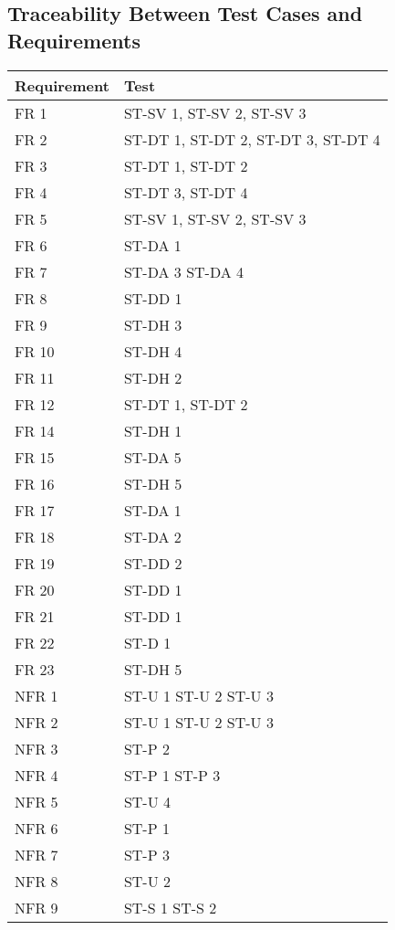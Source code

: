 \documentclass[12pt, titlepage]{article}
\begin{document}
\subsection{Traceability Between Test Cases and Requirements}
\begin{tabular}{| p{} | p{}|}
  \hline
  \rowcolor[gray]{0.9}
  Requirement & Test \\
  \hline
  FR 1 & ST-SV 1, ST-SV 2, ST-SV 3 \\
  \hline
  FR 2 & ST-DT 1, ST-DT 2, ST-DT 3, ST-DT 4 \\
  \hline
  FR 3 & ST-DT 1, ST-DT 2 \\
  \hline
  FR 4 & ST-DT 3, ST-DT 4 \\
  \hline
  FR 5 & ST-SV 1, ST-SV 2, ST-SV 3 \\
  \hline
  FR 6 & ST-DA 1 \\
  \hline
  FR 7 & ST-DA 3 ST-DA 4 \\
  \hline
  FR 8 & ST-DD 1 \\
  \hline
  FR 9 & ST-DH 3 \\
  \hline
  FR 10 & ST-DH 4 \\
  \hline
  FR 11 & ST-DH 2 \\
  \hline
  FR 12 & ST-DT 1, ST-DT 2 \\
  \hline
  FR 14 & ST-DH 1 \\
  \hline
  FR 15 & ST-DA 5\\
  \hline
  FR 16 & ST-DH 5 \\
  \hline
  FR 17 & ST-DA 1 \\
  \hline
  FR 18 & ST-DA 2 \\
  \hline
  FR 19 & ST-DD 2 \\
  \hline
  FR 20 & ST-DD 1 \\
  \hline
  FR 21 & ST-DD 1 \\
  \hline
  FR 22 & ST-D 1 \\
  \hline
  FR 23 & ST-DH 5 \\
  \hline
  NFR 1 & ST-U 1 ST-U 2 ST-U 3 \\
  \hline
  NFR 2 & ST-U 1 ST-U 2 ST-U 3 \\
  \hline
  NFR 3 & ST-P 2 \\
  \hline
  NFR 4 & ST-P 1 ST-P 3 \\
  \hline
  NFR 5 & ST-U 4 \\
  \hline
  NFR 6 & ST-P 1 \\
  \hline
  NFR 7 & ST-P 3 \\
  \hline
  NFR 8 & ST-U 2 \\
  \hline
  NFR 9 & ST-S 1 ST-S 2 \\
  \hline
\end{tabular}
\end{document}
